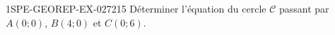 \begin{exercice}{1SPE-GEOREP-EX-027}{2}{15}
Déterminer l'équation du cercle $\mathcal{C}$ passant par $A(0 ; 0)$, $B(4 ; 0)$ et $C(0 ; 6)$.
\end{exercice}
